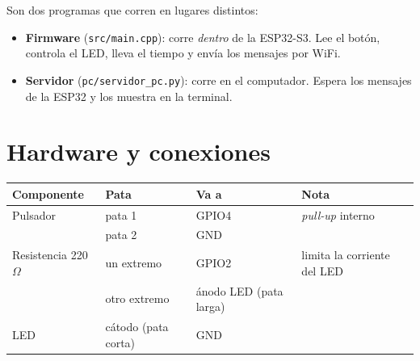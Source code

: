 \documentclass[11pt,a4paper]{article}
\begin{document}
Son dos programas que corren en lugares distintos:

\begin{itemize}[leftmargin=*]
  \item \textbf{Firmware} (\texttt{src/main.cpp}): corre \emph{dentro} de la ESP32-S3.
        Lee el botón, controla el LED, lleva el tiempo y envía los mensajes por WiFi.
  \item \textbf{Servidor} (\texttt{pc/servidor\_pc.py}): corre en el computador.
        Espera los mensajes de la ESP32 y los muestra en la terminal.
\end{itemize}

\section{Hardware y conexiones}

\begin{center}
\begin{tabular}{@{}llll@{}}
\toprule
\textbf{Componente} & \textbf{Pata} & \textbf{Va a} & \textbf{Nota}\\
\midrule
Pulsador & pata 1 & GPIO4 & \textit{pull-up} interno\\
         & pata 2 & GND   & \\
Resistencia 220\,$\Omega$ & un extremo & GPIO2 & limita la corriente del LED\\
         & otro extremo & ánodo LED (pata larga) & \\
LED      & cátodo (pata corta) & GND & \\
\bottomrule
\end{tabular}
\end{center}
\end{document}
